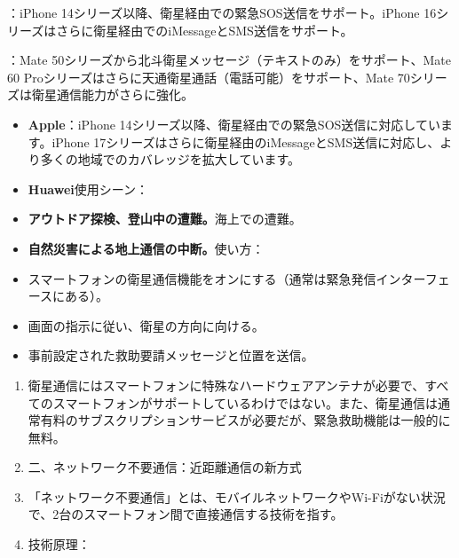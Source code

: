 


：iPhone 14シリーズ以降、衛星経由での緊急SOS送信をサポート。iPhone 16シリーズはさらに衛星経由でのiMessageとSMS送信をサポート。


：Mate 50シリーズから北斗衛星メッセージ（テキストのみ）をサポート、Mate 60 Proシリーズはさらに天通衛星通話（電話可能）をサポート、Mate 70シリーズは衛星通信能力がさらに強化。


\begin{itemize}
  \item \textbf{Apple}：iPhone 14シリーズ以降、衛星経由での緊急SOS送信に対応しています。iPhone 17シリーズはさらに衛星経由のiMessageとSMS送信に対応し、より多くの地域でのカバレッジを拡大しています。
  \item \textbf{Huawei}使用シーン：
  \item \textbf{アウトドア探検、登山中の遭難。}海上での遭難。
  \item \textbf{自然災害による地上通信の中断。}使い方：
\end{itemize}


\begin{itemize}
  \item スマートフォンの衛星通信機能をオンにする（通常は緊急発信インターフェースにある）。
  \item 画面の指示に従い、衛星の方向に向ける。
  \item 事前設定された救助要請メッセージと位置を送信。
\end{itemize}


\begin{enumerate}
  \item 衛星通信にはスマートフォンに特殊なハードウェアアンテナが必要で、すべてのスマートフォンがサポートしているわけではない。また、衛星通信は通常有料のサブスクリプションサービスが必要だが、緊急救助機能は一般的に無料。
  \item 二、ネットワーク不要通信：近距離通信の新方式
  \item 「ネットワーク不要通信」とは、モバイルネットワークやWi-Fiがない状況で、2台のスマートフォン間で直接通信する技術を指す。
  \item 技術原理：
\end{enumerate}

